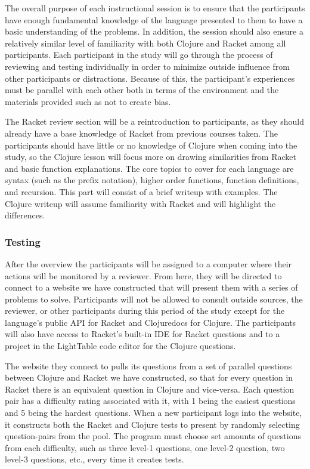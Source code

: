 \documentclass[12pt]{article}
\begin{document}
The overall purpose of each instructional session is to ensure that the participants have enough fundamental knowledge of the language presented to them to have a basic understanding of the problems. 
In addition, the session should also ensure a relatively similar level of familiarity with both Clojure and Racket among all participants. 
Each participant in the study will go through the process of reviewing and testing individually in order to minimize outside influence from other participants or distractions. 
Because of this, the participant's experiences must be parallel with each other both in terms of the environment and the materials provided such as not to create bias.

The Racket review section will be a reintroduction to participants, as they should already have a base knowledge of Racket from previous courses taken.
The participants should have little or no knowledge of Clojure when coming into the study, so the Clojure lesson will focus more on drawing similarities from Racket and basic function explanations.
The core topics to cover for each language are syntax (such as the prefix notation), higher order functions, function definitions, and recursion.
This part will consist of a brief writeup with examples. The Clojure writeup will assume familiarity with Racket and will highlight the differences. 

\subsubsection{Testing}\label{subsec:testing}

After the overview the participants will be assigned to a computer where their actions will be monitored by a reviewer. 
From here, they will be directed to connect to a website we have constructed that will present them with a series of problems to solve. 
Participants will not be allowed to consult outside sources, the reviewer, or other participants during this period of the study except for the language's public API for Racket and Clojuredocs for Clojure.
The participants will also have access to Racket's built-in IDE for Racket questions and to a project in the LightTable code editor for the Clojure questions. 

The website they connect to pulls its questions from a set of parallel questions between Clojure and Racket we have constructed, so that for every question in Racket there is an equivalent question in Clojure and vice-versa.
Each question pair has a difficulty rating associated with it, with 1 being the easiest questions and 5 being the hardest questions.
When a new participant logs into the website, it constructs both the Racket and Clojure tests to present by randomly selecting question-pairs from the pool. 
The program must choose set amounts of questions from each difficulty, such as three level-1 questions, one level-2 question, two level-3 questions, etc., every time it creates tests. 
\end{document}
